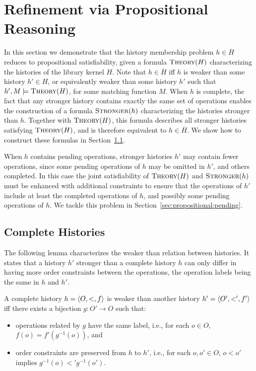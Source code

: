 \section{Refinement via Propositional Reasoning}
\label{sec:propositional}

In this section we demonstrate that the history membership problem $h \in
\overline{H}$ reduces to propositional satisfiability, given a formula
$\textsc{Theory}(H)$ characterizing the histories of the library kernel $H$.
Note that $h \in \overline{H}$ if{f} $h$ is weaker than some history $h' \in
H$, or equivalently weaker than some history $h'$ such that $h',M \models
\textsc{Theory}(H)$, for some matching function $M$. When $h$ is complete, the
fact that any stronger history contains exactly the same set of operations
enables the construction of a formula $\textsc{Stronger}(h)$ characterizing the
histories stronger than $h$. Together with $\textsc{Theory}(H)$, this formula
describes all stronger histories satisfying $\textsc{Theory}(H)$, and is
therefore equivalent to $h \in \overline{H}$. We show how to construct these
formulas in Section~\ref{sec:propositional:complete}.

When $h$ contains pending operations, stronger histories $h'$ may contain fewer
operations, since some pending operations of $h$ may be omitted in $h'$, and
others completed. In this case the joint satisfiability of $\textsc{Theory}(H)$
and $\textsc{Stronger}(h)$ must be enhanced with additional constraints to
ensure that the operations of $h'$ include at least the completed operations of
$h$, and possibly some pending operations of $h$. We tackle this problem in
Section~\ref{sec:propositional:pending}.

\subsection{Complete Histories}
\label{sec:propositional:complete}

The following lemma characterizes the weaker than relation between
histories. It states that a history $h'$ stronger than a complete history $h$
can only differ in having more order constraints between the operations, the
operation labels being the same in $h$ and $h'$.

\begin{lemma}
  \label{lemma:complete_history}

  A complete history $h={\langle{O,<,f}\rangle}$ is weaker than another history
  $h'={\langle{O',<',f'}\rangle}$ iff there exists a bijection $g:O' \to O$ such that:
  \begin{itemize}

    \item operations related by $g$ have the same label, i.e., for each $o\in
    O$, $f(o)=f'(g^{-1}(o))$, and

    \item order constraints are preserved from $h$ to $h'$, i.e., for each
    $o,o'\in O$, $o< o'$ implies $g^{-1}(o)<' g^{-1}(o')$.

  \end{itemize}

\end{lemma}


